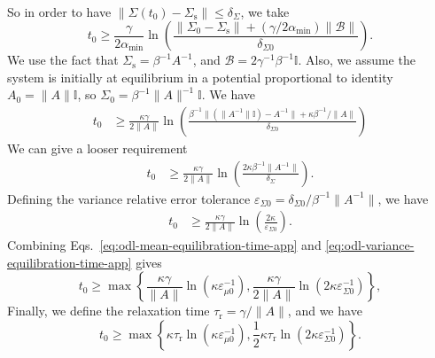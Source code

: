 \documentclass[prx,onecolumn,floatfix,longbibliography,notitlepage, nofootinbib,12pt]{revtex4-2}
\renewcommand{\geq}{\geqslant}
\renewcommand{\leq}{\leqslant}
\begin{document}
\begin{appendix}
\begin{align}
\end{align} 
So in order to have $\|\Sigma(t_0) - \Sigma_\text{s}\| \leq \delta_
\Sigma$, we take
\begin{equation}
    t_0   \geq  \frac{\gamma}{2 \alpha_\text{min}}\ln\left(\frac{\|\Sigma_0 - \Sigma_\text{s}\| + (\gamma / 2\alpha_\text{min})\|\mathcal{B}\|}{\delta_{\Sigma 0}}\right).
\end{equation}
We use the fact that $\Sigma_\text{s} = \beta^{-1} A^{-1}$, and $\mathcal{B} = 2 \gamma^{-1} \beta^{-1} \mathbb{I}$. Also, we assume the system is initially at equilibrium in a potential proportional to identity $A_0 = \|A\|\mathbb{I}$, so $\Sigma_0 = \beta^{-1} \|A\|^{-1}\mathbb{I}$. We have
\begin{align}
    t_0   &\geq  \frac{\kappa\gamma}{2 \|A\|}\ln\left(\frac{\beta^{-1}\|(\|A^{-1}\|\mathbb{I}) - A^{-1}\| + \kappa \beta^{-1}/\|A\|}{\delta_{\Sigma 0}}\right)
\end{align}
We can give a looser requirement
\begin{align}
    t_0   &\geq  \frac{\kappa\gamma}{2\|A\| }\ln\left(\frac{2\kappa\beta^{-1}\|A^{-1}\|}{\delta_\Sigma }\right).
\end{align}
Defining the variance relative error tolerance $\varepsilon_{\Sigma 0} = \delta_{\Sigma 0}/\beta^{-1} \|A^{-1}\|$, we have
\begin{align}
\label{eq:odl-variance-equilibration-time-app}
    t_0   &\geq  \frac{\kappa\gamma}{2 \|A\|}\ln\left(\frac{2\kappa}{\varepsilon_{\Sigma 0}}\right).
\end{align}
Combining Eqs.~\eqref{eq:odl-mean-equilibration-time-app} and \eqref{eq:odl-variance-equilibration-time-app} gives 
\begin{equation}
t_0 \geq \max \left\{\frac{\kappa \gamma}{\|A\|} \ln \left(\kappa \varepsilon^{-1}_{\mu 0}\right),\frac{\kappa\gamma}{2\|A\| }\ln\left(2\kappa\varepsilon_{\Sigma 0}^{-1}\right)\right\},
\end{equation}
Finally, we define the relaxation time $\tau_\text{r} = \gamma/\|A\|$, and we have
\begin{equation}
t_0 \geq \max \left\{\kappa \tau_\text{r}\ln \left(\kappa \varepsilon^{-1}_{\mu 0}\right),\frac{1}{2} \kappa \tau_\text{r}\ln\left(2\kappa\varepsilon_{\Sigma 0}^{-1}\right)\right\}.
\end{equation}


\end{appendix}
\end{document}
